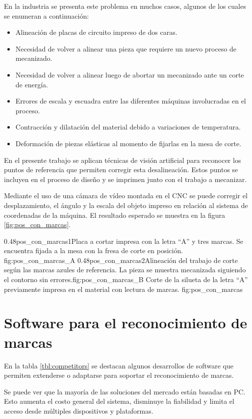          En la industria se presenta este problema en muchos casos, algunos de los cuales se enumeran a continuación:
\begin{itemize}
   \item{Alineación de placas de circuito impreso de dos caras.}
   \item{Necesidad de volver a alinear una pieza que requiere un nuevo proceso de mecanizado.}
   \item{Necesidad de volver a alinear luego de abortar un mecanizado ante un corte de energía.}
   \item{Errores de escala y escuadra entre las diferentes máquinas involucradas en el proceso.}
   \item{Contracción y dilatación del material debido a variaciones de temperatura.}
   \item{Deformación de piezas elásticas al momento de fijarlas en la mesa de corte.}
\end{itemize}

         En el presente trabajo se aplican técnicas de visión artificial para reconocer los puntos de referencia que permiten corregir esta desalineación.
         Estos puntos se incluyen en el proceso de diseño y se imprimen junto con el trabajo a mecanizar.\par
         Mediante el uso de una cámara de vídeo montada en el CNC se puede corregir el desplazamiento, el ángulo y la escala del objeto impreso en relación al sistema de coordenadas de la máquina.
         El resultado esperado se muestra en la figura \ref{fig:pos_con_marcas}.

\subfigab
         {0.48}{pos_con_marcas1}{Placa a cortar impresa con la letra ``A'' y tres marcas. Se encuentra fijada a la mesa con la fresa de corte en posición.\\ \vphantom{10}}{fig:pos_con_marcas_A}
         {0.48}{pos_con_marcas2}{Alineación del trabajo de corte según las marcas azules de referencia. La pieza se muestra mecanizada siguiendo el contorno sin errores.}{fig:pos_con_marcas_B}
         {Corte de la silueta de la letra ``A'' previamente impresa en el material con lectura de marcas. }
         {fig:pos_con_marcas}


\section{Software para el reconocimiento de marcas}
   En la tabla \ref{tbl:competitors} se destacan algunos desarrollos de software que permiten extenderse o adaptarse para soportar el reconocimiento de marcas.\par
   Se puede ver que la mayoría de las soluciones del mercado están basadas en PC. Esto aumenta el costo general del sistema, disminuye la fiabilidad y limita el acceso desde múltiples dispositivos y plataformas.\par

